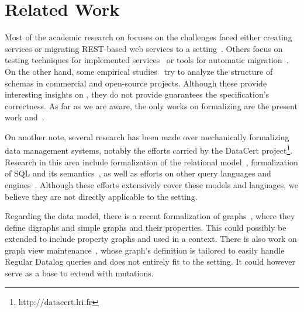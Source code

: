 \section{Related Work}\label{sec:related}

Most of the academic research on \gql focuses on the challenges faced either creating \gql services or migrating REST-based web services to a \gql setting~\cite{improvingoeeu, ehriapi, gqlexperiences}. 
Others focus on testing techniques for implemented \gql services~\cite{gqldeviation} or tools for automatic migration~\cite{migratingapi}. 
On the other hand, some empirical studies~\cite{empiricalgql, empiricalapi} try to analyze the structure of schemas in commercial and open-source projects. 
Although these provide interesting insights on \gql, they do not provide guarantees \wrt the specification's correctness. 
As far as we are aware, the only works on formalizing \gql are the present work and~\cite{gqlph}.

On another note, several research has been made over mechanically formalizing data management systems, notably the efforts carried by the DataCert project\footnote{http://datacert.lri.fr}. 
Research in this area include formalization of the relational model~\cite{relationalcoq}, formalization of SQL and its semantics~\cite{sqlequiv, hottsql, vesqlengines, vesqlsemantics}, 
as well as efforts on other query languages and engines~\cite{certifdatalog}. Although these efforts extensively cover these models and languages, we believe they are 
not directly applicable to the \gql setting. 

Regarding the data model, there is a recent formalization of graphs~\cite{graphtheory}, where they define digraphs and simple graphs and their properties.
This could possibly be extended to include property graphs and used in a \gcoql context.
There is also work on graph view maintenance~\cite{graphviewmaint}, whose graph's definition is tailored to easily handle Regular Datalog queries and does not entirely fit to the \gql setting.
It could however serve as a base to extend \gcoql with mutations. 

